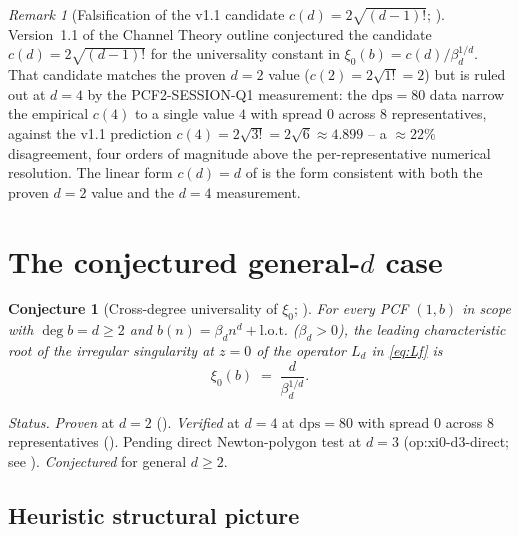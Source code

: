 \documentclass[11pt,reqno]{amsart}
\theoremstyle{plain}
\newtheorem{conjecture}[theorem]{Conjecture}
\theoremstyle{definition}
\theoremstyle{remark}
\newtheorem{remark}[theorem]{Remark}
\newcommand{\dps}{\mathrm{dps}}
\begin{document}
\begin{remark}[Falsification of the v1.1 candidate
$c(d) = 2\sqrt{(d-1)!}$;
{\cite[Remark~3.3.E]{siarc_channel_theory_v13}}]
\label{rem:falsification}
Version~1.1 of the Channel Theory outline conjectured the
candidate $c(d) = 2\sqrt{(d-1)!}$ for the universality
constant in $\xi_0(b) = c(d) / \beta_d^{1/d}$. That
candidate matches the proven $d = 2$ value
($c(2) = 2\sqrt{1!} = 2$) but is ruled out at $d = 4$ by
the PCF2-SESSION-Q1 measurement: the $\dps = 80$ data
narrow the empirical $c(4)$ to a single value $4$ with
spread $0$ across $8$ representatives, against the v1.1
prediction $c(4) = 2\sqrt{3!} = 2\sqrt{6} \approx 4.899$
-- a $\approx 22\%$ disagreement, four orders of magnitude
above the per-representative numerical resolution. The
linear form $c(d) = d$ of  is the form
consistent with both the proven $d = 2$ value and the
$d = 4$ measurement.
\end{remark}

\section{The conjectured general-\texorpdfstring{$d$}{d} case}
\label{sec:conjecture}

\begin{conjecture}[Cross-degree universality of $\xi_0$;
{\cite[Conj.~3.3.A$^{*}$]{siarc_channel_theory_v13}}]
\label{conj:xi0-univ}
For every PCF $(1, b)$ in scope with $\deg b = d \ge 2$ and
$b(n) = \beta_d n^d + \mathrm{l.o.t.}$ ($\beta_d > 0$), the
leading characteristic root of the irregular singularity at
$z = 0$ of the operator $L_d$ in \eqref{eq:Lf} is
\[
  \xi_0(b) \;=\; \frac{d}{\beta_d^{1/d}}.
\]
\end{conjecture}

\noindent\emph{Status.} \emph{Proven} at $d = 2$
(). \emph{Verified} at $d = 4$ at
$\dps = 80$ with spread $0$ across $8$ representatives
(). Pending direct Newton-polygon test
at $d = 3$ (\textsf{op:xi0-d3-direct}; see
). \emph{Conjectured} for general $d \ge 2$.

\subsection*{Heuristic structural picture}
\end{document}
